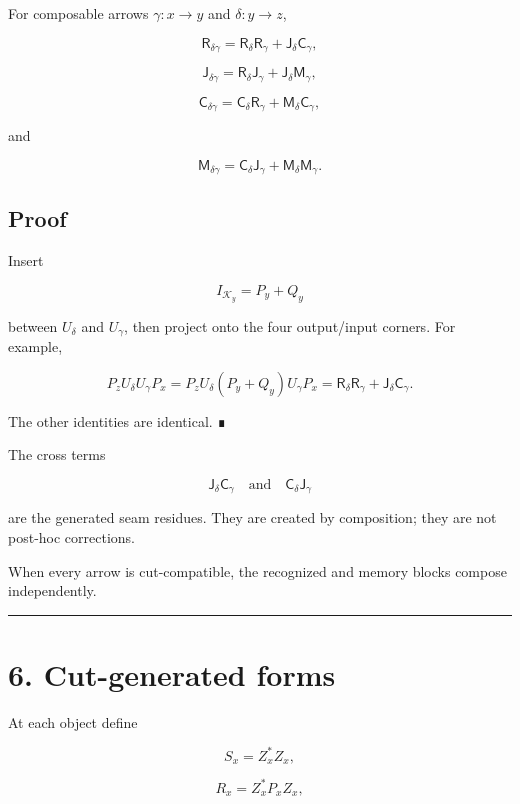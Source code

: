 For composable arrows \(\gamma:x\to y\) and \(\delta:y\to z\),

\[
\boxed{
\mathsf R_{\delta\gamma}
=\mathsf R_\delta\mathsf R_\gamma
+\mathsf J_\delta\mathsf C_\gamma,
}
\]

\[
\boxed{
\mathsf J_{\delta\gamma}
=\mathsf R_\delta\mathsf J_\gamma
+\mathsf J_\delta\mathsf M_\gamma,
}
\]

\[
\boxed{
\mathsf C_{\delta\gamma}
=\mathsf C_\delta\mathsf R_\gamma
+\mathsf M_\delta\mathsf C_\gamma,
}
\]

and

\[
\boxed{
\mathsf M_{\delta\gamma}
=\mathsf C_\delta\mathsf J_\gamma
+\mathsf M_\delta\mathsf M_\gamma.
}
\]

\hypertarget{proof}{%
\subsection{Proof}\label{proof}}

Insert

\[
I_{\mathcal K_y}=P_y+Q_y
\]

between \(U_\delta\) and \(U_\gamma\), then project onto the four output/input
corners. For example,

\[
P_zU_\delta U_\gamma P_x
=P_zU_\delta(P_y+Q_y)U_\gamma P_x
=\mathsf R_\delta\mathsf R_\gamma
+\mathsf J_\delta\mathsf C_\gamma.
\]

The other identities are identical. ∎

The cross terms

\[
\mathsf J_\delta\mathsf C_\gamma
\quad\text{and}\quad
\mathsf C_\delta\mathsf J_\gamma
\]

are the generated seam residues. They are created by composition; they are not
post-hoc corrections.

When every arrow is cut-compatible, the recognized and memory blocks compose
independently.

\begin{center}\rule{0.5\linewidth}{0.5pt}\end{center}

\hypertarget{cut-generated-forms}{%
\section{6. Cut-generated forms}\label{cut-generated-forms}}

At each object define

\[
S_x=Z_x^*Z_x,
\]

\[
R_x=Z_x^*P_xZ_x,
\]

